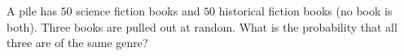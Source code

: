 A pile has $50$ science fiction books and $50$ historical fiction books (no book is both). Three books are pulled out at random. What is the probability that all three are of the same genre?
